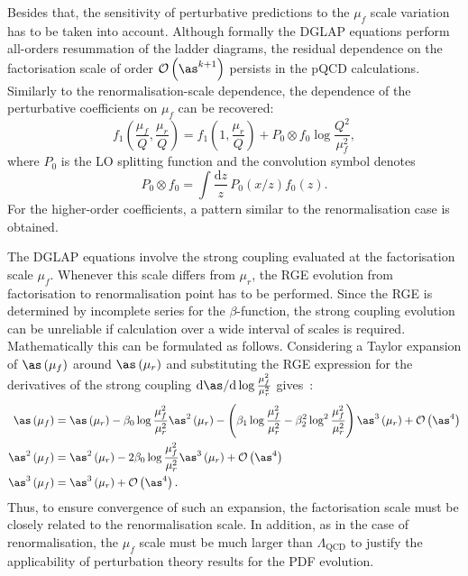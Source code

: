 Besides that, the sensitivity of perturbative predictions to the $\mu_f$ scale variation has to be taken into account. Although formally the DGLAP equations perform all-orders resummation of the ladder diagrams, the residual dependence on the factorisation scale of order $\mathcal{O}\left(\as^{k+1}\right)$ persists in the pQCD calculations. Similarly to the renormalisation-scale dependence, the dependence of the perturbative coefficients on $\mu_f$ can be recovered:
\begin{equation}
 f_1\left(\frac{\mu_f}{Q},\frac{\mu_r}{Q}\right) = f_1\left(1,\frac{\mu_r}{Q}\right) + P_0 \otimes f_0 \log{\frac{Q^2}{\mu_f^2}},
\label{eq:factorisationscaledep}
\end{equation}
where $P_0$ is the LO splitting function and the convolution symbol denotes
\begin{equation}
P_0 \otimes f_0 = \int{\frac{\mathrm{d}z}{z}\,P_0\left(x/z\right)f_0\left(z\right)}.
\end{equation}
For the higher-order coefficients, a pattern similar to the renormalisation case is obtained.

The DGLAP equations involve the strong coupling evaluated at the factorisation scale $\mu_f$. Whenever this scale differs from $\mu_r$, the RGE evolution from factorisation to renormalisation point has to be performed. Since the RGE is determined by incomplete series for the $\beta$-function, the strong coupling evolution can be unreliable if calculation over a wide interval of scales is required. Mathematically this can be formulated as follows. Considering a Taylor expansion of $\as\left(\mu_f\right)$ around $\as\left(\mu_r\right)$ and substituting the RGE expression for the derivatives of the strong coupling $\mathrm{d}\as/\mathrm{d}\log{\frac{\mu_f^2}{\mu_r^2}}$ gives~\cite{Botje:2010ay}:
{\small
\begin{align}
 \as\left(\mu_f\right) &= \as\left(\mu_r\right) - \beta_0\log{\frac{\mu_f^2}{\mu_r^2}}\as^2\left(\mu_r\right) - \left(\beta_1\log{\frac{\mu_f^2}{\mu_r^2}} - \beta_2^2\log^2{\frac{\mu_f^2}{\mu_r^2}}\right)\as^3\left(\mu_r\right) + \mathcal{O}\left(\as^4\right)\\ \nonumber
 \as^2\left(\mu_f\right) & = \as^2\left(\mu_r\right) - 2\beta_0\log{\frac{\mu_f^2}{\mu_r^2}}\as^3\left(\mu_r\right) + \mathcal{O}\left(\as^4\right)\\
\as^3\left(\mu_f\right) & = \as^3\left(\mu_r\right) + \mathcal{O}\left(\as^4\right).
\end{align}
}
Thus, to ensure convergence of such an expansion, the factorisation scale must be closely related to the renormalisation scale. In addition, as in the case of renormalisation, the $\mu_f$ scale must be much larger than $\Lambda_\mathrm{QCD}$ to justify the applicability of perturbation theory results for the PDF evolution.

